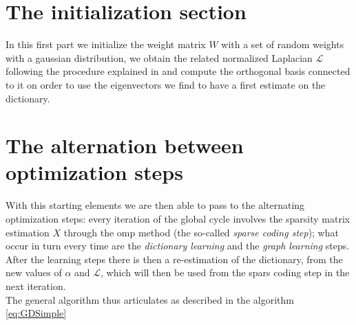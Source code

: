 \section{The initialization section}
In this first part we initialize the weight matrix $W$ with a set of random weights with a gaussian distribution, we obtain the related normalized Laplacian $\mathcal{L}$ following the procedure explained in \cite{Kalofolias2016} and compute the orthogonal basis connected to it on order to use the eigenvectors we find to have a first estimate on the dictionary.

\section{The alternation between optimization steps}
With this starting elements we are then able to pass to the alternating optimization steps: every iteration of the global cycle involves the sparsity matrix estimation $X$ through the \gls{omp} method (the so-called \textit{sparse coding step}); what occur in turn every time are the \textit{dictionary learning} and the \textit{graph learning} steps. After the learning steps there is then a re-estimation of the dictionary, from the new values of $\alpha$ and $\mathcal{L}$, which will then be used from the spars coding step in the next iteration.\\
The general algorithm thus articulates as described in the algorithm \ref{eq:GDSimple}

